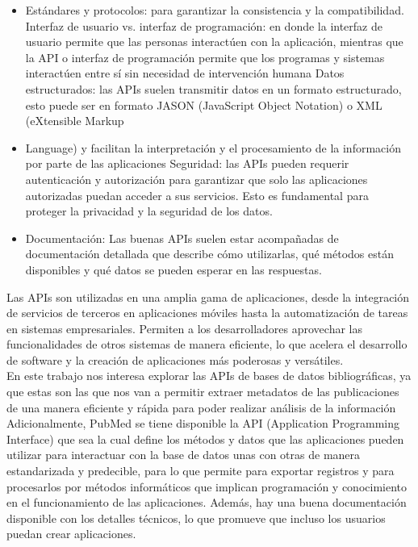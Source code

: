 \documentclass[../Main.tex]{subfiles}
\begin{document}
\begin{itemize}
\item Estándares y protocolos: para garantizar la consistencia y la compatibilidad.
Interfaz de usuario vs. interfaz de programación: en donde la interfaz de usuario permite que las personas interactúen con la aplicación, mientras que la API o interfaz de programación permite que los programas y sistemas interactúen entre sí sin necesidad de intervención humana
Datos estructurados: las APIs suelen transmitir datos en un formato estructurado, esto puede ser en formato JASON (JavaScript Object Notation) o XML (eXtensible Markup 
\item Language) y facilitan la interpretación y el procesamiento de la información por parte de las aplicaciones
Seguridad: las APIs pueden requerir autenticación y autorización para garantizar que solo las aplicaciones autorizadas puedan acceder a sus servicios. Esto es fundamental para proteger la privacidad y la seguridad de los datos.
\item Documentación: Las buenas APIs suelen estar acompañadas de documentación detallada que describe cómo utilizarlas, qué métodos están disponibles y qué datos se pueden esperar en las respuestas.
\end{itemize}

Las APIs son utilizadas en una amplia gama de aplicaciones, desde la integración de servicios de terceros en aplicaciones móviles hasta la automatización de tareas en sistemas empresariales. Permiten a los desarrolladores aprovechar las funcionalidades de otros sistemas de manera eficiente, lo que acelera el desarrollo de software y la creación de aplicaciones más poderosas y versátiles.\\
 
En este trabajo nos interesa explorar las APIs de bases de datos bibliográficas, ya que estas son las que nos van a permitir extraer metadatos de las publicaciones de una manera eficiente y rápida para poder realizar análisis de la información \\
 
Adicionalmente, PubMed se tiene disponible la API (Application Programming Interface) que sea la cual define los métodos y datos que las aplicaciones pueden utilizar para interactuar con la base de datos unas con otras de manera estandarizada y predecible, para lo que permite para exportar registros y para procesarlos por métodos informáticos que implican programación y conocimiento en el funcionamiento de las aplicaciones. Además, hay una buena documentación disponible con los detalles técnicos, lo que promueve que incluso los usuarios puedan crear aplicaciones. 
\end{document}
